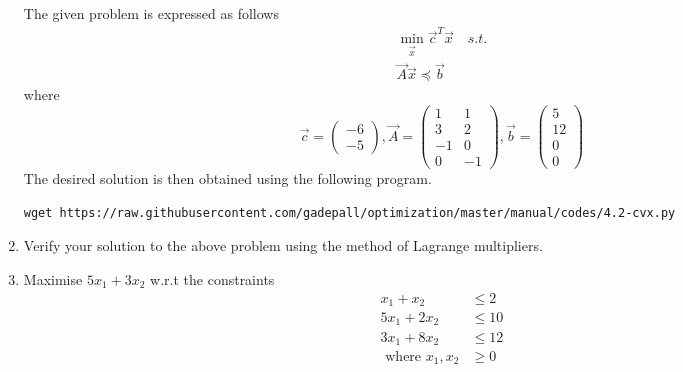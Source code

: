 \documentclass[journal,12pt,twocolumn]{IEEEtran}
\renewcommand\thesection{\arabic{section}}
\begin{document}
\begin{enumerate}[label=\thesection.\arabic*,ref=\thesection.\theenumi]
\solution
The given problem is expressed as follows
%
\begin{align}
\min_{\vec{x}}	\vec{c}^{T}\vec{x}\quad s.t.
\\
\vec{A}\vec{x} \preceq \vec{b}
\end{align}
%
where
%
\begin{equation}
\vec{c}
=
\begin{pmatrix}
-6
\\
-5
\end{pmatrix},
\vec{A} = 
\begin{pmatrix}
1 & 1
\\
3 & 2
\\
-1 & 0
\\
0 & -1
\end{pmatrix},
\vec{b}
= 
\begin{pmatrix}
5
\\
12
\\
0
\\
0 
\end{pmatrix}
\end{equation}
%	
The desired solution is then obtained using the following program.
%
%
%
\begin{lstlisting}
wget https://raw.githubusercontent.com/gadepall/optimization/master/manual/codes/4.2-cvx.py
\end{lstlisting}

\item
	Verify your solution to the above problem using the method of Lagrange multipliers.

%
\item
	 Maximise $5x_1 + 3x_2$ w.r.t the constraints
	 \begin{align}
	 x_1 + x_2 &\leq 2 \nonumber\\
	 5x_1 + 2x_2 &\leq 10 \nonumber\\
	 3x_1 + 8x_2 &\leq 12 \nonumber\\
	 \text{ where } x_1,x_2 &\geq 0 \nonumber
	 \end{align}	

\end{enumerate}
%
\end{document}
